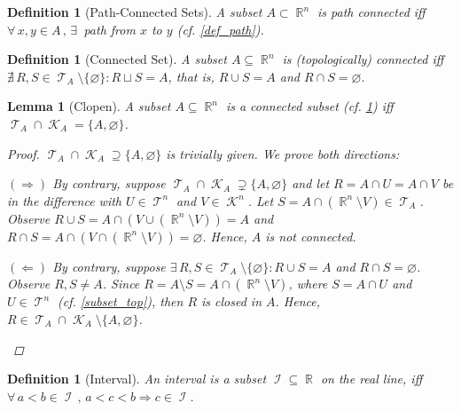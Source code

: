 \documentclass[12pt]{article}
\let\emptyset\varnothing
\let\RA\Rightarrow
\let\LA\Leftarrow
\newcommand{\Forall}[1]{\forall\,{#1}\,,\,}
\newcommand{\Exist}[1]{\exists\,{#1}:}
\newcommand{\NExist}[1]{\nexists\,{#1}:}
\DeclareMathOperator{\R}{\mathbb{R}}
\DeclareMathOperator{\I}{\mathcal{I}}
\DeclareMathOperator{\T}{\mathcal{T}}
\DeclareMathOperator{\K}{\mathcal{K}}
\newcommand{\comp}[2][n]{\R^{#1}\setminus{#2}}
\newtheorem{definition}[theorem]{Definition}
\newtheorem{lemma}[theorem]{Lemma}
\begin{document}
\begin{definition}[Path-Connected Sets]
  \label{path_connected}
  A subset $A\subset\R^n$ is path connected iff $\Forall{x,y\in A}\exists\,$ path from $x$ to $y$ (cf. \ref{def_path}).
\end{definition}

\begin{definition}[Connected Set]
  \label{def_connected}
  A subset $A\subseteq \R^n$ is (topologically) connected iff $\NExist{R,S\in \T_A\setminus\{\emptyset\}}R\sqcup S= A$, that is, $R\cup S=A$ and $R\cap S=\emptyset$.
\end{definition}

\begin{lemma}[Clopen]
  \label{clopen}
  A subset $A\subseteq \R^n$ is a connected subset (cf. \ref{def_connected}) iff $\T_A\cap\K_A=\{A,\emptyset\}$.
  \begin{proof}
    $\T_A\cap\K_A\supseteq\{A,\emptyset\}$ is trivially given. We prove both directions:
    \begin{compactitem}
      \item[$(\RA)$] By contrary, suppose $\T_A\cap\K_A\supsetneq\{A,\emptyset\}$ and let $R=A\cap U=A\cap V$ be in the difference with $U\in\T^n$ and $V\in\K^n$. Let $S=A\cap(\comp{V})\in\T_A$. Observe $R\cup S=A\cap(V\cup(\comp{V}))=A$ and $R\cap S=A\cap(V\cap(\comp{V}))=\emptyset$. Hence, $A$ is not connected.
      \item[$(\LA)$] By contrary, suppose $\Exist{R,S\in \T_A\setminus\{\emptyset\}}R\cup S=A$ and $R\cap S=\emptyset$. Observe $R,S\neq A$. Since $R=A\setminus S=A\cap(\comp{V})$, where $S=A\cap U$ and $U\in\T^n$ (cf. \ref{subset_top}), then $R$ is closed in $A$. Hence, $R\in \T_A\cap\K_A\setminus\{A,\emptyset\}$.
    \end{compactitem}
  \end{proof}
\end{lemma}

\begin{definition}[Interval]
  \label{def_interval}
  An interval is a subset $\I\subseteq \R$ on the real line, iff $\Forall{a<b\in\I}a<c<b\RA c\in\I$.
\end{definition}
\end{document}
